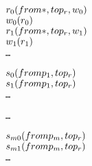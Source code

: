 \newsavebox{\TemplateboxTZero}
\begin{lrbox}{\TemplateboxTZero}
\begin{minipage}[t]{0.4\linewidth}
\large
\begin{alltt}
\(r\sb{0}(from \ast, to p\sb{r}, w\sb{0})\)
\(w\sb{0}(r\sb{0})\)
\(r\sb{1}(from \ast, to p\sb{r}, w\sb{1})\)
\(w\sb{1}(r\sb{1})\)
\ldots
\end{alltt}
\end{minipage}
\end{lrbox}

\newsavebox{\TemplateboxTOne}
\begin{lrbox}{\TemplateboxTOne}
\begin{minipage}[t]{0.35\linewidth}
\large
\begin{alltt}
\(s\sb{0}(from p\sb{1}, to p\sb{r})\)
\(s\sb{1}(from p\sb{1}, to p\sb{r})\)
\ldots
\end{alltt}
\end{minipage}
\end{lrbox}

\newsavebox{\TemplateboxTTwo}
\begin{lrbox}{\TemplateboxTTwo}
\begin{minipage}[t]{0.05\linewidth}
\large
\begin{alltt}
\ldots
\end{alltt}
\end{minipage}
\end{lrbox}

\newsavebox{\TemplateboxTThree}
\begin{lrbox}{\TemplateboxTThree}
\begin{minipage}[t]{0.35\linewidth}
\large
\begin{alltt}
\(s\sb{m0}(from p\sb{m}, to p\sb{r})\)
\(s\sb{m1}(from p\sb{m}, to p\sb{r})\)
\ldots
\end{alltt}
\end{minipage}
\end{lrbox}

\newcommand\examplefigtemplate{
\begin{figure*}[tb]
\begin{center}
\setlength{\tabcolsep}{2pt}
\begin{tabular}[t]{c|c|c|c}
$\mathit{p_r}$ & $\mathit{p_1}$ & $\ldots$ &$\mathit{p_m}$ \\
\hline
\scalebox{0.8}{\usebox{\TemplateboxTZero}}&
\scalebox{0.8}{\usebox{\TemplateboxTOne}} &
\scalebox{0.8}{\usebox{\TemplateboxTTwo}} &
\scalebox{0.8}{\usebox{\TemplateboxTThree}}

\end{tabular}
\end{center}
\caption{A template concurrent trace prorgam.}
\label{fig:Texample}
\end{figure*}
}







